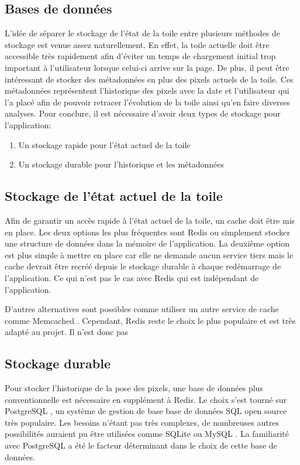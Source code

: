 \subsection{Bases de données}

L'idée de séparer le stockage de l'état de la toile entre plusieurs méthodes de stockage est venue assez naturellement. En effet, la toile actuelle doit être accessible très rapidement afin d'éviter un temps de chargement initial trop important à l'utilisateur lorsque celui-ci arrive sur la page. De plus, il peut être intéressant de stocker des métadonnées en plus des pixels actuels de la toile. Ces métadonnées représentent l'historique des pixels avec la date et l'utilisateur qui l'a placé afin de pouvoir retracer l'évolution de la toile ainsi qu'en faire diverses analyses. Pour conclure, il est nécessaire d'avoir deux types de stockage pour l'application:

\begin{enumerate}
  \item Un stockage rapide pour l'état actuel de la toile
  \item Un stockage durable pour l'historique et les métadonnées
\end{enumerate}

\subsection{Stockage de l'état actuel de la toile}

Afin de garantir un accès rapide à l'état actuel de la toile, un cache doit être mis en place. Les deux options les plus fréquentes sont Redis \cite{redis} ou simplement stocker une structure de données dans la mémoire de l'application. La deuxième option est plus simple à mettre en place car elle ne demande aucun service tiers mais le cache devrait être recréé depuis le stockage durable à chaque redémarrage de l'application. Ce qui n'est pas le cas avec Redis qui est indépendant de l'application.

D'autres alternatives sont possibles comme utiliser un autre service de cache comme Memcached \cite{memcached}. Cependant, Redis reste le choix le plus populaire et est très adapté au projet. Il n'est donc pas

\subsection{Stockage durable}

Pour stocker l'historique de la pose des pixels, une base de données plus conventionnelle est nécessaire en supplément à Redis. Le choix s'est tourné sur PostgreSQL \cite{postgresql}, un système de gestion de base base de données SQL open source très populaire. Les besoins n'étant pas très complexes, de nombreuses autres possibilités auraient pu être utilisées comme SQLite \cite{sqlite} ou MySQL \cite{mysql}. La familiarité avec PostgreSQL a été le facteur déterminant dans le choix de cette base de données.

